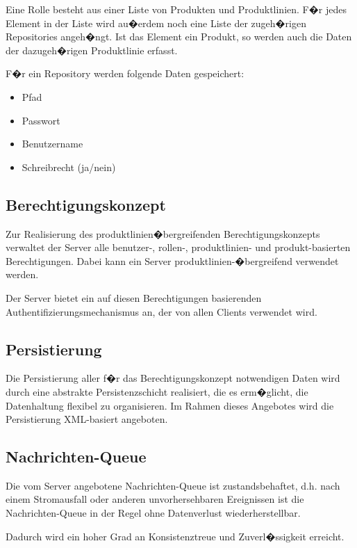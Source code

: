 Eine Rolle besteht aus einer Liste von Produkten und Produktlinien.\newline
F�r jedes Element in der Liste wird au�erdem noch eine Liste der zugeh�rigen Repositories angeh�ngt. 
Ist das Element ein Produkt, so werden auch die Daten der dazugeh�rigen Produktlinie erfasst.\newline

F�r ein Repository werden folgende Daten gespeichert:
\begin{itemize}
\item Pfad
\item Passwort
\item Benutzername
\item Schreibrecht (ja/nein)
\end{itemize}

\subsection{Berechtigungskonzept}

Zur Realisierung des produktlinien\-�bergreifenden Berechtigungskonzepts
verwaltet der Server alle benutzer-, rollen-, produktlinien- und
produkt-basierten Berechtigungen. Dabei kann ein Server produktlinien-�bergreifend
verwendet werden.\par
Der Server bietet ein auf diesen Berechtigungen basierenden
Authentifizierungsmechanismus an, der von allen Clients verwendet wird.

\subsection{Persistierung}

Die Persistierung aller f�r das Berechtigungskonzept notwendigen Daten wird
durch eine abstrakte Persistenzschicht realisiert, die es erm�glicht, die
Datenhaltung flexibel zu organisieren. Im Rahmen dieses Angebotes wird die
Persistierung XML-basiert angeboten.

\subsection{Nachrichten-Queue}

Die vom Server angebotene Nachrichten-Queue ist zustandsbehaftet, d.h. nach einem
Stromausfall oder anderen unvorhersehbaren Ereignissen ist die Nachrichten-Queue
in der Regel ohne Datenverlust wiederherstellbar.\par
Dadurch wird ein hoher Grad an Konsistenztreue und Zuverl�ssigkeit erreicht.\newline


